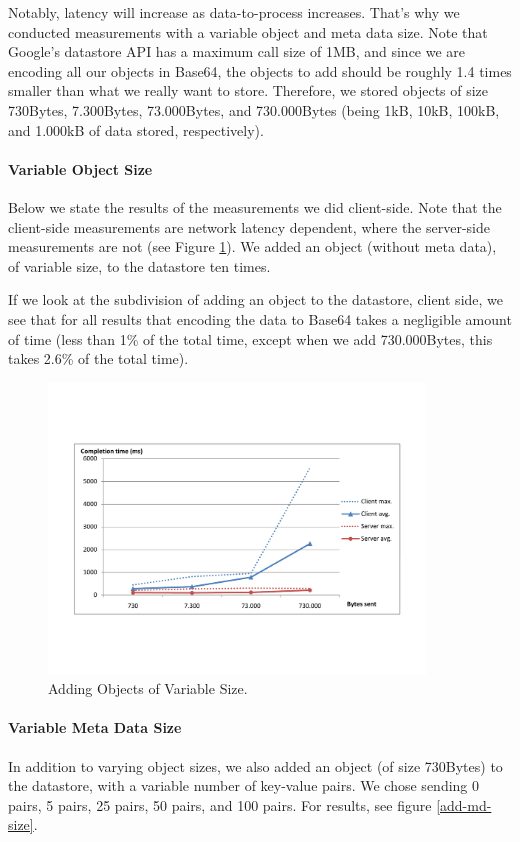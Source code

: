 Notably, latency will increase as data-to-process increases. That's why we
conducted measurements with a variable object and meta data size. Note that
Google's datastore API has a maximum call size of 1MB, and since we are
encoding all our objects in Base64, the objects to add should be roughly 1.4
times smaller than what we really want to store. Therefore, we stored objects 
of size 730Bytes, 7.300Bytes, 73.000Bytes, and 730.000Bytes (being 1kB, 10kB,
100kB, and 1.000kB of data stored, respectively).

\paragraph{Variable Object Size}
Below we state the results of the measurements we did client-side. Note that
the client-side measurements are network latency dependent, where the
server-side measurements are not (see Figure \ref{add-obj-size}). We added an
object (without meta data), of variable size, to the datastore ten times.

If we look at the subdivision of adding an object to the datastore, client
side, we see that for all results that encoding the data to Base64 takes a
negligible amount of time (less than 1\% of the total time, except when we add
730.000Bytes, this takes 2.6\% of the total time). 

\begin{figure} %
\begin{center}
\includegraphics[trim=5cm 4cm 5cm 5cm,width=10cm]{./figures/add_obj.pdf}
\caption{Adding Objects of Variable Size. \label{add-obj-size}}
\end{center}
\end{figure}

\paragraph{Variable Meta Data Size}
In addition to varying object sizes, we also added an object (of size 730Bytes)
to the datastore, with a variable number of key-value pairs. We chose sending 0
pairs, 5 pairs, 25 pairs, 50 pairs, and 100 pairs. For results, see figure
\ref{add-md-size}.

